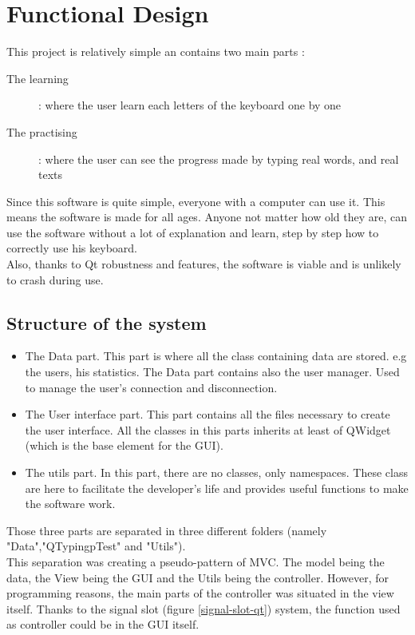 \chapter{Functional Design}
This project is relatively simple an contains two main parts :
\begin{description}
	\item[The learning] : where the user learn each letters of the keyboard one by one
	\item[The practising] : where the user can see the progress made by typing real words, and real texts
\end{description}
Since this software is quite simple, everyone with a computer can use it. This means the software is made for all ages. Anyone not matter how old they are, can use the software without a lot of explanation and learn, step by step how to correctly use his keyboard.\\
Also, thanks to Qt robustness and features, the software is viable and is unlikely to crash during use.

\section{Structure of the system}

\begin{itemize}
	\item The Data part. This part is where all the class containing data are stored. e.g the users, his statistics. The Data part contains also the user manager. Used to manage the user's connection and disconnection.
	\item The User interface part. This part contains all the files necessary to create the user interface. All the classes in this parts inherits at least of QWidget (which is the base element for the GUI).
	\item The utils part. In this part, there are no classes, only namespaces. These class are here to facilitate the developer's life and provides useful functions to make the software work.  
\end{itemize}

Those three parts are separated in three different folders (namely "Data","QTypingpTest" and "Utils").\\
This separation was creating a pseudo-pattern of MVC. The model being the data, the View being the GUI and the Utils being the controller. However, for programming reasons, the main parts of the controller was situated in the view itself. Thanks to the signal slot (figure \ref{signal-slot-qt}) system, the function used as controller could be in the GUI itself.



